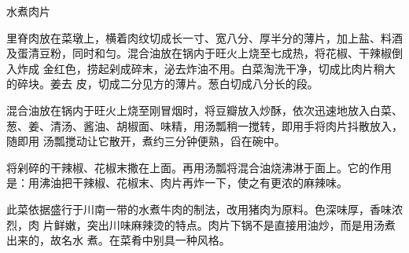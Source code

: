 \begin{recipe}{水煮肉片}

\ingredients


\cooking

\step 里脊肉放在菜墩上，横着肉纹切成长一寸、宽八分、厚半分的薄片，加上盐、料酒
及蛋清豆粉，同时和匀。混合油放在锅内于旺火上烧至七成热，将花椒、干辣椒倒入炸成
金红色，捞起剁成碎末，泌去炸油不用。白菜淘洗干净，切成比肉片稍大的碎块。姜去
皮，切成二分见方的薄片。葱白切成八分长的段。

\step 混合油放在锅内于旺火上烧至刚冒烟时，将豆瓣放入炒酥，依次迅速地放入白菜、
葱、姜、清汤、酱油、胡椒面、味精，用汤瓢稍一搅转，即用手将肉片抖散放入，随即用
汤瓢搅动让它散开，煮约三分钟便熟，舀在碗中。

\step 将剁碎的干辣椒、花椒末撒在上面。再用汤瓢将混合油烧沸淋于面上。它的作用
是：用沸油把干辣椒、花椒末、肉片再炸一下，使之有更浓的麻辣味。

\notes

此菜依据盛行于川南一带的水煮牛肉的制法，改用猪肉为原料。色深味厚，香味浓烈，肉
片鲜嫩，突出川味麻辣烫的特点。肉片下锅不是直接用油炒，而是用汤煮出来的，故名水
煮。在菜肴中别具一种风格。

\end{recipe}

